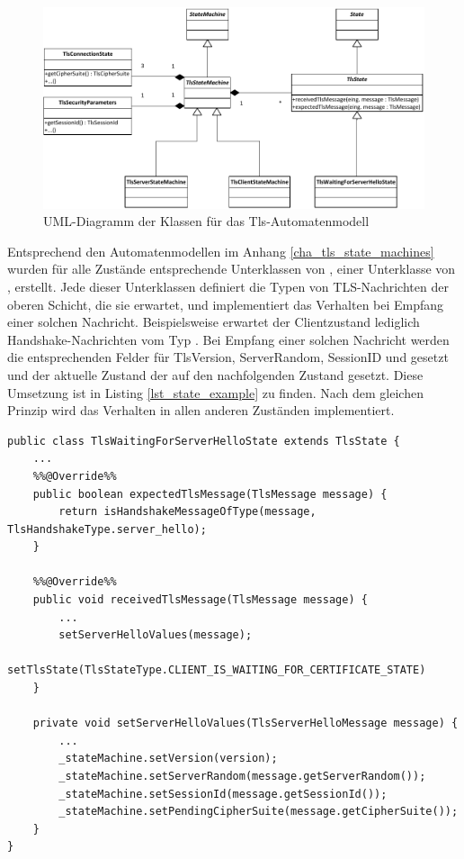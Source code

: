 \begin{figure}
	\centering
	\includegraphics[scale=0.9]{Diagrams/uml/tls_state_machine.pdf} 
	\caption{UML-Diagramm der Klassen für das Tls-Automatenmodell}
	\label{fig_uml_tls_state_machine}
\end{figure}

Entsprechend den Automatenmodellen im Anhang \ref{cha_tls_state_machines} wurden für alle Zustände entsprechende Unterklassen von , einer Unterklasse von , erstellt. Jede dieser Unterklassen definiert die Typen von TLS-Nachrichten der oberen Schicht, die sie erwartet, und implementiert das Verhalten bei Empfang einer solchen Nachricht. Beispielsweise erwartet der Clientzustand  lediglich Handshake-Nachrichten vom Typ \serverhello{}. Bei Empfang einer solchen Nachricht werden die entsprechenden Felder für TlsVersion, ServerRandom, SessionID und \ciphersuite{} gesetzt und der aktuelle Zustand der  auf den nachfolgenden Zustand gesetzt. Diese Umsetzung ist in Listing \ref{lst_state_example} zu finden. Nach dem gleichen Prinzip wird das Verhalten in allen anderen Zuständen implementiert. 

\begin{lstlisting}
public class TlsWaitingForServerHelloState extends TlsState {
	...
	%%@Override%%
	public boolean expectedTlsMessage(TlsMessage message) {
		return isHandshakeMessageOfType(message, TlsHandshakeType.server_hello);
	}

	%%@Override%%
	public void receivedTlsMessage(TlsMessage message) {
		...
		setServerHelloValues(message);
		setTlsState(TlsStateType.CLIENT_IS_WAITING_FOR_CERTIFICATE_STATE)
	}

	private void setServerHelloValues(TlsServerHelloMessage message) {
		...
		_stateMachine.setVersion(version);
		_stateMachine.setServerRandom(message.getServerRandom());
		_stateMachine.setSessionId(message.getSessionId());
		_stateMachine.setPendingCipherSuite(message.getCipherSuite());
	}
}
\end{lstlisting}

